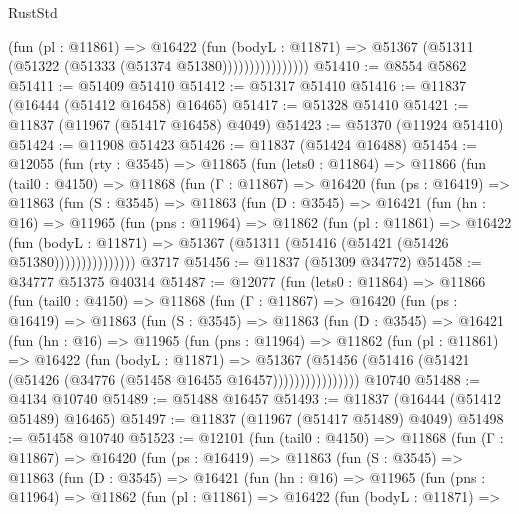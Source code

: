 \begin{lexlean}{RustStd}
\begin{coremodule}
{\begin{coremodule}
{{{{{{{{{{{{{{{{{{{{{{{{{{{{{{{{{{{{{{{{{{{{{{{{{{                        (fun (pl : @11861) =>
                        @16422
                          (fun (bodyL : @11871) =>
                          @51367 (@51311 (@51322 (@51333 (@51374 @51380))))))))))))))))
@51410 := @8554 @5862
@51411 := @51409 @51410
@51412 := @51317 @51410
@51416 := @11837 (@16444 (@51412 @16458) @16465)
@51417 := @51328 @51410
@51421 := @11837 (@11967 (@51417 @16458) @4049)
@51423 := @51370 (@11924 @51410)
@51424 := @11908 @51423
@51426 := @11837 (@51424 @16488)
@51454 := @12055
    (fun (rty : @3545) =>
    @11865
      (fun (lets0 : @11864) =>
      @11866
        (fun (tail0 : @4150) =>
        @11868
          (fun (Γ : @11867) =>
          @16420
            (fun (ps : @16419) =>
            @11863
              (fun (S : @3545) =>
              @11863
                (fun (D : @3545) =>
                @16421
                  (fun (hn : @16) =>
                  @11965
                    (fun (pns : @11964) =>
                    @11862
                      (fun (pl : @11861) =>
                      @16422
                        (fun (bodyL : @11871) =>
                        @51367 (@51311 (@51416 (@51421 (@51426 @51380)))))))))))))))
    @3717
@51456 := @11837 (@51309 @34772)
@51458 := @34777 @51375 @40314
@51487 := @12077
    (fun (lets0 : @11864) =>
    @11866
      (fun (tail0 : @4150) =>
      @11868
        (fun (Γ : @11867) =>
        @16420
          (fun (ps : @16419) =>
          @11863
            (fun (S : @3545) =>
            @11863
              (fun (D : @3545) =>
              @16421
                (fun (hn : @16) =>
                @11965
                  (fun (pns : @11964) =>
                  @11862
                    (fun (pl : @11861) =>
                    @16422
                      (fun (bodyL : @11871) =>
                      @51367
                        (@51456
                          (@51416 (@51421 (@51426 (@34776 (@51458 @16455 @16457))))))))))))))))
    @10740
@51488 := @4134 @10740
@51489 := @51488 @16457
@51493 := @11837 (@16444 (@51412 @51489) @16465)
@51497 := @11837 (@11967 (@51417 @51489) @4049)
@51498 := @51458 @10740
@51523 := @12101
    (fun (tail0 : @4150) =>
    @11868
      (fun (Γ : @11867) =>
      @16420
        (fun (ps : @16419) =>
        @11863
          (fun (S : @3545) =>
          @11863
            (fun (D : @3545) =>
            @16421
              (fun (hn : @16) =>
              @11965
                (fun (pns : @11964) =>
                @11862
                  (fun (pl : @11861) =>
                  @16422
                    (fun (bodyL : @11871) =>
}}}}}}}}}}}}}}}}}}}}}}}}}}}}}}}}}}}}}}}}}}}}}}}}}}
\end{coremodule}}
\end{coremodule}
\end{lexlean}
